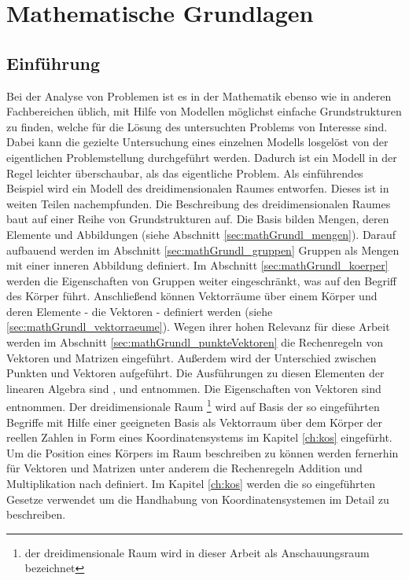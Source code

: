 \chapter{Mathematische Grundlagen}\label{ch:mathGrundl}
\section{Einf\"uhrung}\label{sec:mathGrundl_einfuehrung}
    Bei der Analyse von Problemen ist es in der Mathematik  ebenso wie in anderen Fachbereichen \"ublich, mit Hilfe von Modellen m\"oglichst einfache Grundstrukturen zu finden, welche f\"ur die L\"osung des untersuchten Problems von Interesse sind. Dabei kann die gezielte Untersuchung eines einzelnen Modells losgel\"ost von der eigentlichen Problemstellung durchgef\"uhrt werden. Dadurch ist ein Modell in der Regel leichter \"uberschaubar, als das eigentliche Problem. \newline
    Als einf\"uhrendes Beispiel wird ein Modell des dreidimensionalen Raumes entworfen. Dieses ist in weiten Teilen \cite{Bosch2014} nachempfunden. \newline
    Die Beschreibung des dreidimensionalen Raumes baut auf einer Reihe von Grundstrukturen auf. Die Basis bilden Mengen, deren Elemente und Abbildungen (siehe Abschnitt \ref{sec:mathGrundl_mengen}). Darauf aufbauend werden im Abschnitt \ref{sec:mathGrundl_gruppen} Gruppen als Mengen mit einer inneren Abbildung  definiert. Im Abschnitt \ref{sec:mathGrundl_koerper} werden die Eigenschaften von Gruppen weiter eingeschr\"ankt, was auf den Begriff des K\"orper f\"uhrt. Anschlie\ss{}end k\"onnen Vektorr\"aume \"uber einem K\"orper und deren Elemente - die Vektoren - definiert werden (siehe \ref{sec:mathGrundl_vektorraeume}). Wegen ihrer hohen Relevanz f\"ur diese Arbeit werden im Abschnitt \ref{sec:mathGrundl_punkteVektoren} die Rechenregeln von Vektoren und Matrizen eingef\"uhrt. Au\ss{}erdem wird der Unterschied zwischen Punkten und Vektoren aufgef\"uhrt. Die Ausf\"uhrungen zu diesen Elementen der linearen Algebra sind \cite{Bosch2014}, \cite{MatthiasPlaue2009} und \cite{Modler2011d} entnommen. Die Eigenschaften von Vektoren sind \cite{Papula2014} entnommen. \newline
    Der dreidimensionale Raum \footnote{der dreidimensionale Raum wird in dieser Arbeit als Anschauungsraum bezeichnet}  wird auf Basis der so eingef\"uhrten Begriffe mit Hilfe  einer geeigneten Basis als Vektorraum \"uber dem K\"orper der reellen Zahlen in Form eines Koordinatensystems im Kapitel \ref{ch:kos} eingef\"urht.   \newline
    Um die Position eines K\"orpers im Raum beschreiben zu k\"onnen werden fernerhin f\"ur Vektoren und Matrizen unter anderem die Rechenregeln Addition und Multiplikation nach \cite{Papula2014} definiert. Im Kapitel \ref{ch:kos} werden die so eingef\"uhrten Gesetze verwendet um die Handhabung von Koordinatensystemen im Detail zu beschreiben. \newline
    
